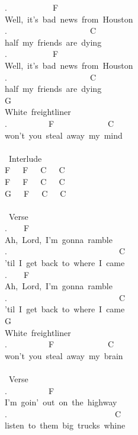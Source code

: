 {.\ \ \ \ \ \ \ \ \ \ \ F\\
Well,\ it's\ bad\ news\ from\ Houston\\
.\ \ \ \ \ \ \ \ \ \ \ \ \ \ \ \ \ \ \ \ C\\
half\ my\ friends\ are\ dying\\
.\ \ \ \ \ \ \ \ \ \ \ F\\
Well,\ it's\ bad\ news\ from\ Houston\\
.\ \ \ \ \ \ \ \ \ \ \ \ \ \ \ \ \ \ \ \ C\\
half\ my\ friends\ are\ dying\\
G\\
White\ freightliner\\
.\ \ \ \ \ \ \ \ \ \ F\ \ \ \ \ \ \ \ \ \ \ \ \ C\\
won't\ you\ steal\ away\ my\ mind\\
\\
\lbrack\ Interlude\rbrack\\
F\ \ \ F\ \ \ C\ \ \ C\\
F\ \ \ F\ \ \ C\ \ \ C\\
G\ \ \ F\ \ \ C\ \ \ C\\
\\
\lbrack\ Verse\rbrack\\
.\ \ \ \ F\\
Ah,\ Lord,\ I'm\ gonna\ ramble\\
.\ \ \ \ \ \ \ \ \ \ \ \ \ \ \ \ \ \ \ \ \ \ \ \ \ \ \ C\\
'til\ I\ get\ back\ to\ where\ I\ came\\
.\ \ \ \ F\\
Ah,\ Lord,\ I'm\ gonna\ ramble\\
.\ \ \ \ \ \ \ \ \ \ \ \ \ \ \ \ \ \ \ \ \ \ \ \ \ \ \ C\\
'til\ I\ get\ back\ to\ where\ I\ came\\
G\\
White\ freightliner\\
.\ \ \ \ \ \ \ \ \ \ F\ \ \ \ \ \ \ \ \ \ \ \ \ C\\
won't\ you\ steal\ away\ my\ brain\\
\\
\lbrack\ Verse\rbrack\\
.\ \ \ \ \ \ \ \ \ \ F\\
I'm\ goin'\ out\ on\ the\ highway\\
.\ \ \ \ \ \ \ \ \ \ \ \ \ \ \ \ \ \ \ \ \ \ \ \ \ \ C\\
listen\ to\ them\ big\ trucks\ whine\\
}
